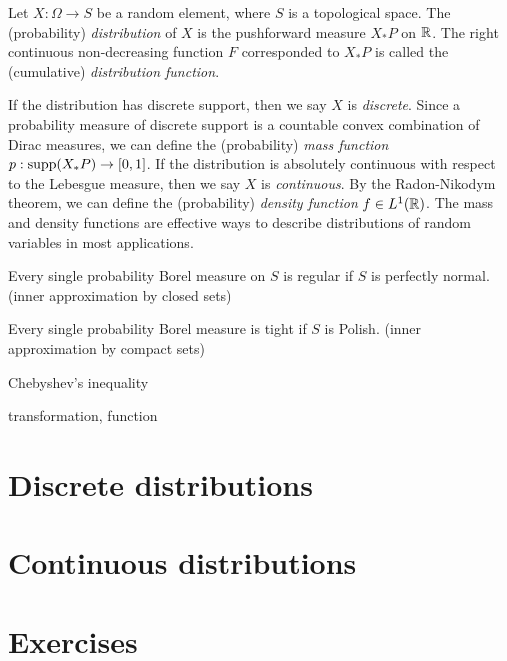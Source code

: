 \documentclass{../../large}
\begin{document}
\begin{prb}
Let $X:\Omega\to S$ be a random element, where $S$ is a topological space.
The (probability) \emph{distribution} of $X$ is the pushforward measure $X_*P$ on $\mathbb{R}$.
The right continuous non-decreasing function $F$ corresponded to $X_*P$ is called the (cumulative) \emph{distribution function}.

If the distribution has discrete support, then we say $X$ is \emph{discrete}.
Since a probability measure of discrete support is a countable convex combination of Dirac measures, we can define the (probability) \emph{mass function} $p:\operatorname{supp}(X_*P)\to[0,1]$.
If the distribution is absolutely continuous with respect to the Lebesgue measure, then we say $X$ is \emph{continuous}.
By the Radon-Nikodym theorem, we can define the (probability) \emph{density function} $f\in L^1(\mathbb{R})$.
The mass and density functions are effective ways to describe distributions of random variables in most applications.
\begin{parts}
\item Every single probability Borel measure on $S$ is regular if $S$ is perfectly normal. (inner approximation by closed sets)
\item Every single probability Borel measure is tight if $S$ is Polish. (inner approximation by compact sets)
\end{parts}
\end{prb}


\begin{prb}
Chebyshev's inequality
\end{prb}
\begin{prb}
\end{prb}
\begin{prb}
transformation, function
\end{prb}


\section{Discrete distributions}

\section{Continuous distributions}



\section*{Exercises}
\end{document}
